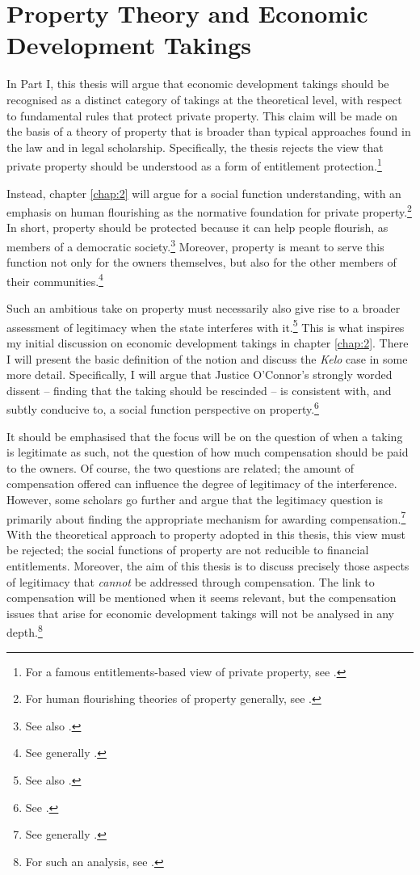 \section{Property Theory and Economic Development Takings}\label{sec:1:1}

In Part I, this thesis will argue that economic development takings should be recognised as a distinct category of takings at the theoretical level, with respect to fundamental rules that protect private property. This claim will be made on the basis of a theory of property that is broader than typical approaches found in the law and in legal scholarship. Specifically, the thesis rejects the view that private property should be understood as a form of entitlement protection.\footnote{For a famous entitlements-based view of private property, see \cite{calabresi72}.}

Instead, chapter \ref{chap:2} will argue for a social function understanding, with an emphasis on human flourishing as the normative foundation for private property.\footnote{For human flourishing theories of property generally, see \cite[chapter 5]{alexander10}.} In short, property should be protected because it can help people flourish, as members of a democratic society.\footnote{See also \cite[1089]{crawford11}.} Moreover, property is meant to serve this function not only for the owners themselves, but also for the other members of their communities.\footnote{See generally \cite{gray94,alexander09d,alexander14}.}

Such an ambitious take on property must necessarily also give rise to a broader assessment of legitimacy when the state interferes with it.\footnote{See also \cite{underkuffler06}.} This is what inspires my initial discussion on economic development takings in chapter \ref{chap:2}. There I will present the basic definition of the notion and discuss the {\it Kelo} case in some more detail. Specifically, I will argue that Justice O'Connor's strongly worded dissent -- finding that the taking should be rescinded -- is consistent with, and subtly conducive to, a social function perspective on property.\footnote{See \cite[494-505]{kelo05}.}

It should be emphasised that the focus will be on the question of when a taking is legitimate as such, not the question of how much compensation should be paid to the owners. Of course, the two questions are related; the amount of compensation offered can influence the degree of legitimacy of the interference. However, some scholars go further and argue that the legitimacy question is primarily about finding the appropriate mechanism for awarding compensation.\footnote{See generally \cite{fennell04,bell07,lehavi07}.} With the theoretical approach to property adopted in this thesis, this view must be rejected; the social functions of property are not reducible to financial entitlements. Moreover, the aim of this thesis is to discuss precisely those aspects of legitimacy that {\it cannot} be addressed through compensation. The link to compensation will be mentioned when it seems relevant, but the compensation issues that arise for economic development takings will not be analysed in any depth.\footnote{For such an analysis, see \cite{dyrkolbotn15a}.}


